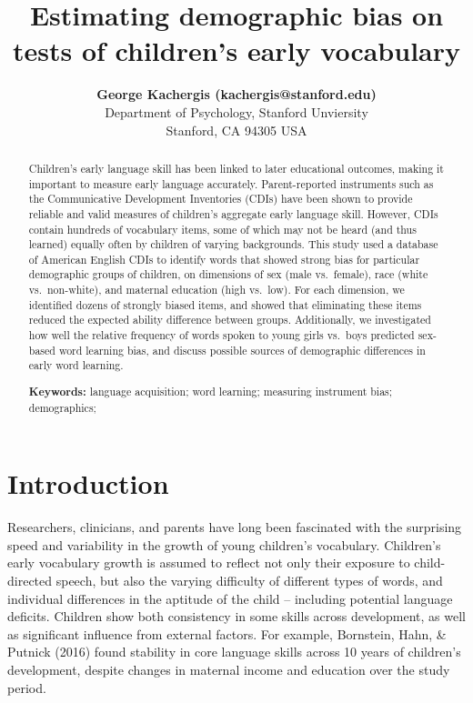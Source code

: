 \documentclass[10pt, letterpaper]{article}
\title{Estimating demographic bias on tests of children's early
vocabulary}
\author{{\large \bf George Kachergis (kachergis@stanford.edu)} \AND {\large \bf Nathan Francis (nathan99@stanford.edu)} \AND {\large \bf Michael C. Frank (mcfrank@stanford.edu)} \\ Department of Psychology, Stanford Unviersity \\ Stanford, CA 94305 USA }
\begin{document}
\maketitle

\begin{abstract}
Children's early language skill has been linked to later educational
outcomes, making it important to measure early language accurately.
Parent-reported instruments such as the Communicative Development
Inventories (CDIs) have been shown to provide reliable and valid
measures of children's aggregate early language skill. However, CDIs
contain hundreds of vocabulary items, some of which may not be heard
(and thus learned) equally often by children of varying backgrounds.
This study used a database of American English CDIs to identify words
that showed strong bias for particular demographic groups of children,
on dimensions of sex (male vs.~female), race (white vs.~non-white), and
maternal education (high vs.~low). For each dimension, we identified
dozens of strongly biased items, and showed that eliminating these items
reduced the expected ability difference between groups. Additionally, we
investigated how well the relative frequency of words spoken to young
girls vs.~boys predicted sex-based word learning bias, and discuss
possible sources of demographic differences in early word learning.

\textbf{Keywords:}
language acquisition; word learning; measuring instrument bias;
demographics;
\end{abstract}

\hypertarget{introduction}{%
\section{Introduction}\label{introduction}}

Researchers, clinicians, and parents have long been fascinated with the
surprising speed and variability in the growth of young children's
vocabulary. Children's early vocabulary growth is assumed to reflect not
only their exposure to child-directed speech, but also the varying
difficulty of different types of words, and individual differences in
the aptitude of the child -- including potential language deficits.
Children show both consistency in some skills across development, as
well as significant influence from external factors. For example,
Bornstein, Hahn, \& Putnick (2016) found stability in core language
skills across 10 years of children's development, despite changes in
maternal income and education over the study period.
\end{document}
